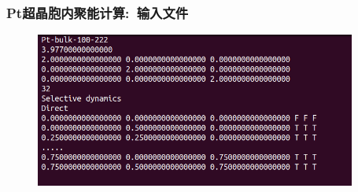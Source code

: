 \frame
{
	\frametitle{\textrm{Pt}超晶胞内聚能计算:~输入文件}
\begin{figure}[h!]
\centering
\vskip -5pt
\includegraphics[height=2.0in,viewport=0 25 500 270,clip]{Figures/Pt_Bulk-POSCAR.png}
\caption{\fontsize{6.2pt}{5.2pt}}%
\label{Pt_Bulk-POSCAR}
\end{figure}
}

